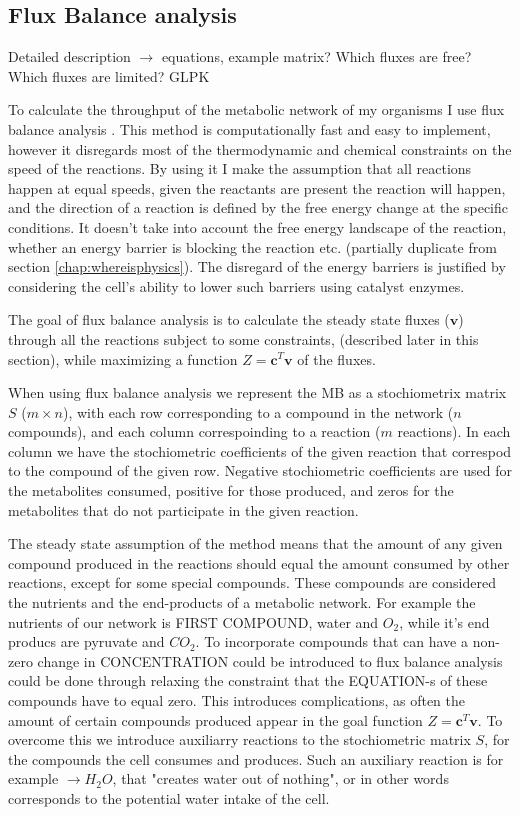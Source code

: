 \documentclass[10pt,a4paper]{article}
\begin{document}
\subsection{Flux Balance analysis}
\label{sub:Flux Balance analysis}

Detailed description $\rightarrow$ equations, example matrix? Which fluxes are free? Which fluxes are limited? GLPK 



	To calculate the throughput of the metabolic network of my organisms I use flux balance analysis \cite{whatisfluxbalance}. This method is computationally fast and easy to implement, however it disregards most of the thermodynamic and chemical constraints on the speed of the reactions. By using it I make the assumption that all reactions happen at equal speeds, given the reactants are present the reaction will happen, and the direction of a reaction is defined by the free energy change at the specific conditions. It doesn't take into account the free energy landscape of the reaction, whether an energy barrier is blocking the reaction etc. (partially duplicate from section \ref{chap:whereisphysics}). The disregard of the energy barriers is justified by considering the cell's ability to lower such barriers using catalyst enzymes.
	
	The goal of flux balance analysis is to calculate the steady state fluxes ($\mathbf{v}$) through all the reactions subject to some constraints, (described later in this section), while maximizing a function $Z=\mathbf{c}^T \mathbf{v}$ of the fluxes. 

	When using flux balance analysis we represent the MB as a stochiometrix matrix $S$ ($m\times n$), with each row corresponding to a compound in the network ($n$ compounds), and each column correspoinding to a reaction ($m$ reactions). In each column we have the stochiometric coefficients of the given reaction that correspod to the compound of the given row. Negative stochiometric coefficients are used for the metabolites consumed, positive for those produced, and zeros for the metabolites that do not participate in the given reaction.
 
	The steady state assumption of the method means that the amount of any given compound produced in the reactions should equal the amount consumed by other reactions, except for some special compounds. These compounds are considered the nutrients and the end-products of a metabolic network. For example the nutrients of our network is FIRST COMPOUND, water and $O_2$, while it's end producs are pyruvate and $CO_2$. To incorporate compounds that can have a non-zero change in CONCENTRATION could be introduced to flux balance analysis could be done through relaxing the constraint that the EQUATION-s of these compounds have to equal zero. This introduces complications, as often the amount of certain compounds produced appear in the goal function  $Z=\mathbf{c}^T \mathbf{v}$. To overcome this we introduce auxiliarry reactions to the stochiometric matrix $S$, for the compounds the cell consumes and produces. Such an auxiliary reaction is for example $ \rightarrow H_2O$, that "creates water out of nothing", or in other words corresponds to the potential water intake of the cell.
\end{document}

